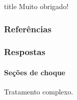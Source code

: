 \documentclass[svgnames,smaller,table]{beamer}
\begin{document}
\begin{frame}[allowframebreaks]
 \vfill
  \begin{beamercolorbox}[center]{title}
     \Huge{Muito obrigado!}
  \end{beamercolorbox}
  \vfill

\end{frame}

\begin{frame}[allowframebreaks]
        \frametitle{Referências}
        
        
\end{frame}


\begin{frame}[noframenumbering]
  \frametitle{Respostas}
  \framesubtitle{Seções de choque}
  Tratamento complexo.
\end{frame}
\end{document}
